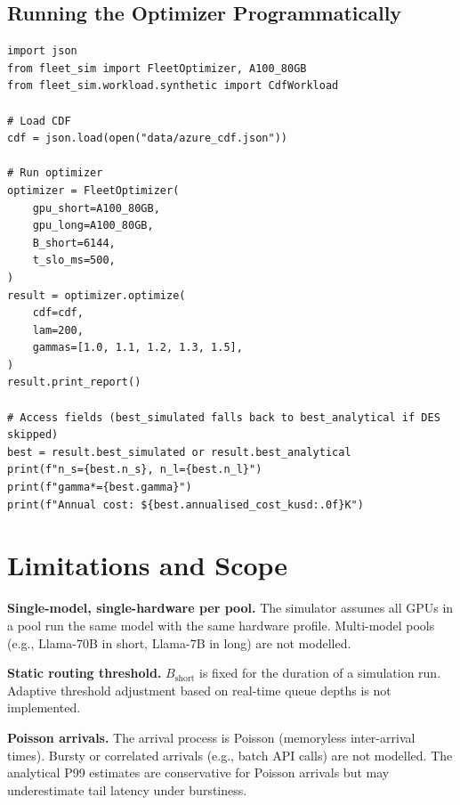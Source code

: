 \documentclass[11pt,a4paper]{article}
\newcommand{\Bshort}{B_{\text{short}}}
\begin{document}
\subsection{Running the Optimizer Programmatically}

\begin{lstlisting}[style=python]
import json
from fleet_sim import FleetOptimizer, A100_80GB
from fleet_sim.workload.synthetic import CdfWorkload

# Load CDF
cdf = json.load(open("data/azure_cdf.json"))

# Run optimizer
optimizer = FleetOptimizer(
    gpu_short=A100_80GB,
    gpu_long=A100_80GB,
    B_short=6144,
    t_slo_ms=500,
)
result = optimizer.optimize(
    cdf=cdf,
    lam=200,
    gammas=[1.0, 1.1, 1.2, 1.3, 1.5],
)
result.print_report()

# Access fields (best_simulated falls back to best_analytical if DES skipped)
best = result.best_simulated or result.best_analytical
print(f"n_s={best.n_s}, n_l={best.n_l}")
print(f"gamma*={best.gamma}")
print(f"Annual cost: ${best.annualised_cost_kusd:.0f}K")
\end{lstlisting}

\section{Limitations and Scope}
\label{sec:limitations}

\textbf{Single-model, single-hardware per pool.}
The simulator assumes all GPUs in a pool run the same model with the
same hardware profile.  Multi-model pools (e.g., Llama-70B in short,
Llama-7B in long) are not modelled.

\textbf{Static routing threshold.}
$\Bshort$ is fixed for the duration of a simulation run.  Adaptive
threshold adjustment based on real-time queue depths is not implemented.

\textbf{Poisson arrivals.}
The arrival process is Poisson (memoryless inter-arrival times).  Bursty
or correlated arrivals (e.g., batch API calls) are not modelled.
The analytical P99 estimates are conservative for Poisson arrivals but
may underestimate tail latency under burstiness.
\end{document}
